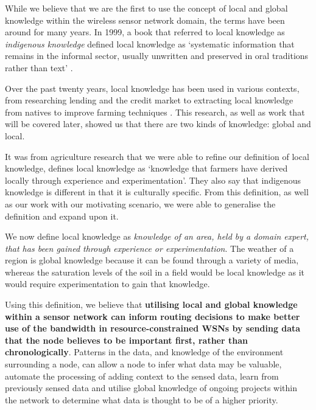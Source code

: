 While we believe that we are the first to use the concept of local and global knowledge within the wireless sensor network domain, the terms have been around for many years. In 1999, a book that referred to local knowledge as \textit{indigenous knowledge} defined local knowledge as `systematic information that remains in the informal sector, usually unwritten and preserved in oral traditions rather than text' \cite{LadislausM.Semali}. 

Over the past twenty years, local knowledge has been used in various contexts, from researching lending and the credit market \cite{Stiglitz1990} to extracting local knowledge from natives to improve farming techniques \cite{DEWALT}. This research, as well as work that will be covered later, showed us that there are two kinds of knowledge: global and local. 

It was from agriculture research that we were able to refine our definition of local knowledge, \cite{Joshi2001} defines local knowledge as `knowledge that farmers have derived locally through experience and experimentation'. They also say that indigenous knowledge is different in that it is culturally specific. From this definition, as well as our work with our motivating scenario, we were able to generalise the definition and expand upon it.

We now define local knowledge as \textit{knowledge of an area, held by a domain expert, that has been gained through experience or experimentation}. The weather of a region is global knowledge because it can be found through a variety of media, whereas the saturation levels of the soil in a field would be local knowledge as it would require experimentation to gain that knowledge. 

Using this definition, we believe that \textbf{utilising local and global knowledge within a sensor network can inform routing decisions to make better use of the bandwidth in resource-constrained WSNs by sending data that the node believes to be important first, rather than chronologically}. Patterns in the data, and knowledge of the environment surrounding a node, can allow a node to infer what data may be valuable, automate the processing of adding context to the sensed data, learn from previously sensed data and utilise global knowledge of ongoing projects within the network to determine what data is thought to be of a higher priority.

